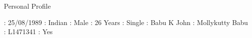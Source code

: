 \documentclass{resume}
\begin{document}
\begin{category}{Personal Profile}
 
           :   25/08/1989 
             :   Indian 
                  :   Male 
                     :   26 Years 
          :   Single 
           :   Babu K John 
           :   Mollykutty Babu 
         :   L1471341
     :   Yes
\end{category}


\end{document}
